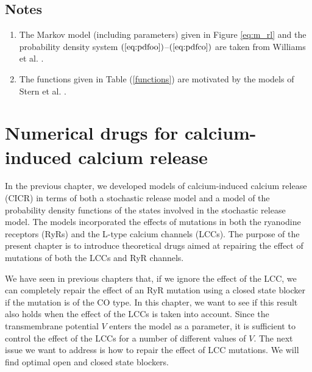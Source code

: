 \section{Notes}
\begin{enumerate}
\item The Markov model  (including parameters)  given in Figure \ref{eq:m_rl} and the probability density system  $(  \ref{eq:pdfoo})$--$(\ref{eq:pdfco})  $
 are taken from Williams et al. \cite{Williams2007}.
\item The functions given in Table (\ref{functions}) are motivated by the models of Stern et al. \cite{Stern1999}.
\end{enumerate}

\chapter[Numerical drugs for CICR]{Numerical drugs for calcium-induced calcium release}





In the previous chapter, we developed models of calcium-induced calcium release (CICR) in terms of both a stochastic release model and a model of the probability density functions of the states involved in the stochastic release model. The models incorporated the effects of mutations in both the ryanodine receptors (RyRs) and the L-type calcium channels (LCCs).
The purpose of the present chapter is to introduce theoretical drugs aimed at repairing the effect of mutations of both the LCCs and RyR channels. 

We have seen in previous chapters that, if we ignore the effect of the LCC, we can completely repair the effect of an RyR mutation using a closed state blocker if the mutation is of the CO type. In this chapter, we want to see if this result also holds when the effect of the LCCs is taken into account. Since the transmembrane potential $V$ enters the model as a parameter, it is sufficient to control the effect of the LCCs for a number of different values of $V$.
The next issue we want to address is how to repair the effect of LCC mutations. 
We will find optimal open and closed state blockers. 


